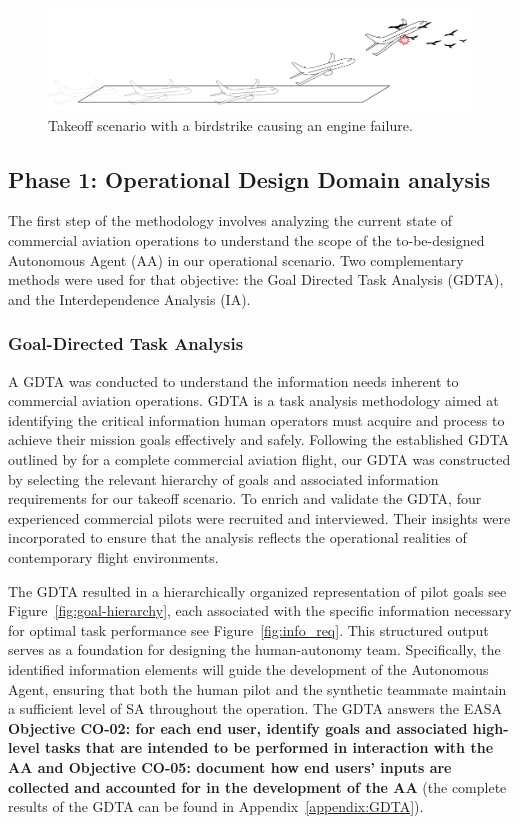 \documentclass[12pt,a4paper]{article} %
\begin{document}
	\begin{figure}[H]
 		\centering
  		\includegraphics[width=1\textwidth]{./images/scenario.png}
   		\caption{Takeoff scenario with a birdstrike causing an engine failure.}
		\label{fig:takeoff-scenario-simplified}
	\end{figure}

	\subsection{Phase 1: Operational Design Domain analysis}
	The first step of the methodology involves analyzing the current state of commercial aviation operations to understand the scope of the to-be-designed Autonomous Agent (AA) in our operational scenario. Two complementary methods were used for that objective: the Goal Directed Task Analysis (GDTA), and the Interdependence Analysis (IA).

	\subsubsection{Goal-Directed Task Analysis}
	A GDTA was conducted to understand the information needs inherent to commercial aviation operations. GDTA is a task analysis methodology aimed at identifying the critical information human operators must acquire and process to achieve their mission goals effectively and safely.
	Following the established GDTA outlined by \textcite{endsley_designing_2003} for a complete commercial aviation flight, our GDTA was constructed by selecting the relevant hierarchy of goals and associated information requirements for our takeoff scenario. To enrich and validate the GDTA, four experienced commercial pilots were recruited and interviewed. Their insights were incorporated to ensure that the analysis reflects the operational realities of contemporary flight environments.

	The GDTA resulted in a hierarchically organized representation of pilot goals see Figure~\ref{fig:goal-hierarchy}, each associated with the specific information necessary for optimal task performance see Figure~\ref{fig:info_req}. This structured output serves as a foundation for designing the human-autonomy team. Specifically, the identified information elements will guide the development of the Autonomous Agent, ensuring that both the human pilot and the synthetic teammate maintain a sufficient level of SA throughout the operation. The GDTA answers the EASA \textbf{Objective CO-02: for each end user, identify goals and associated high-level tasks that are intended to be performed in interaction with the AA and Objective CO-05: document how end users' inputs are collected and accounted for in the development of the AA} (the complete results of the GDTA can be found in Appendix~\ref{appendix:GDTA}).
\end{document}
